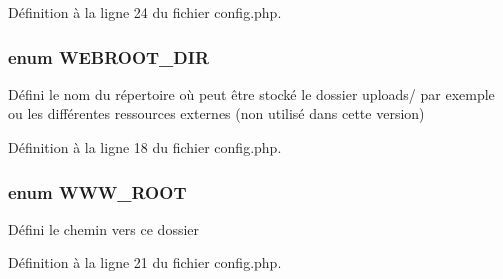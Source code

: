 Définition à la ligne 24 du fichier config.\-php.

\hypertarget{config_8php_acc89219e61ea2ce8121b3869250a8f0f}{
\subsubsection[{W\-E\-B\-R\-O\-O\-T\-\_\-\-D\-I\-R}]{\setlength{\rightskip}{0pt plus 5cm}enum {\bf W\-E\-B\-R\-O\-O\-T\-\_\-\-D\-I\-R}}}\label{config_8php_acc89219e61ea2ce8121b3869250a8f0f}
Défini le nom du répertoire où peut être stocké le dossier uploads/ par exemple ou les différentes ressources externes (non utilisé dans cette version) 

Définition à la ligne 18 du fichier config.\-php.

\hypertarget{config_8php_a4b96c2dcb0982d6857b9579a76f18a5f}{
\subsubsection[{W\-W\-W\-\_\-\-R\-O\-O\-T}]{\setlength{\rightskip}{0pt plus 5cm}enum {\bf W\-W\-W\-\_\-\-R\-O\-O\-T}}}\label{config_8php_a4b96c2dcb0982d6857b9579a76f18a5f}
Défini le chemin vers ce dossier 

Définition à la ligne 21 du fichier config.\-php.

